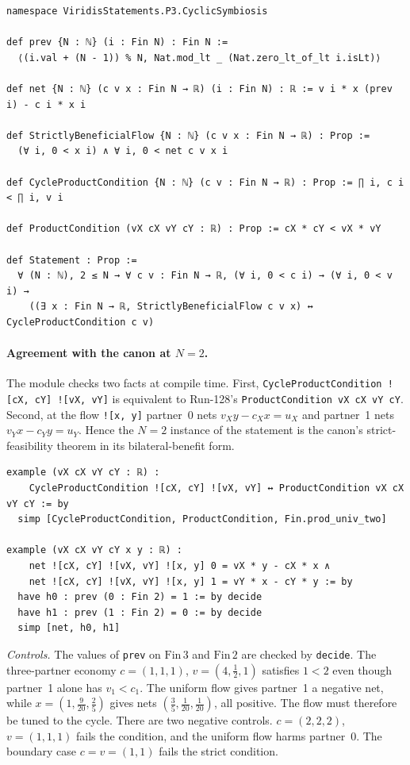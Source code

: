 \documentclass[11pt]{article}
\theoremstyle{remark}
\begin{document}
\begin{lstlisting}[caption={Core of \texttt{proposals/P3.CyclicSymbiosis.lean}. \texttt{ProductCondition} is copied verbatim from the canon file.}]
namespace ViridisStatements.P3.CyclicSymbiosis

def prev {N : ℕ} (i : Fin N) : Fin N :=
  ⟨(i.val + (N - 1)) % N, Nat.mod_lt _ (Nat.zero_lt_of_lt i.isLt)⟩

def net {N : ℕ} (c v x : Fin N → ℝ) (i : Fin N) : ℝ := v i * x (prev i) - c i * x i

def StrictlyBeneficialFlow {N : ℕ} (c v x : Fin N → ℝ) : Prop :=
  (∀ i, 0 < x i) ∧ ∀ i, 0 < net c v x i

def CycleProductCondition {N : ℕ} (c v : Fin N → ℝ) : Prop := ∏ i, c i < ∏ i, v i

def ProductCondition (vX cX vY cY : ℝ) : Prop := cX * cY < vX * vY

def Statement : Prop :=
  ∀ (N : ℕ), 2 ≤ N → ∀ c v : Fin N → ℝ, (∀ i, 0 < c i) → (∀ i, 0 < v i) →
    ((∃ x : Fin N → ℝ, StrictlyBeneficialFlow c v x) ↔ CycleProductCondition c v)
\end{lstlisting}

\paragraph{Agreement with the canon at $N=2$.}
The module checks two facts at compile time. First,
\texttt{CycleProductCondition ![cX, cY] ![vX, vY]} is equivalent to Run-128's
\texttt{ProductCondition vX cX vY cY}. Second, at the flow \texttt{![x, y]} partner~0 nets
$v_Xy-c_Xx=u_X$ and partner~1 nets $v_Yx-c_Yy=u_Y$. Hence the $N=2$ instance of the statement is
the canon's strict-feasibility theorem in its bilateral-benefit form.

\begin{lstlisting}[caption={The $N=2$ agreement checks, as they appear in the module.}]
example (vX cX vY cY : ℝ) :
    CycleProductCondition ![cX, cY] ![vX, vY] ↔ ProductCondition vX cX vY cY := by
  simp [CycleProductCondition, ProductCondition, Fin.prod_univ_two]

example (vX cX vY cY x y : ℝ) :
    net ![cX, cY] ![vX, vY] ![x, y] 0 = vX * y - cX * x ∧
    net ![cX, cY] ![vX, vY] ![x, y] 1 = vY * x - cY * y := by
  have h0 : prev (0 : Fin 2) = 1 := by decide
  have h1 : prev (1 : Fin 2) = 0 := by decide
  simp [net, h0, h1]
\end{lstlisting}

\emph{Controls.} The values of \texttt{prev} on $\mathrm{Fin}\,3$ and $\mathrm{Fin}\,2$ are
checked by \texttt{decide}. The three-partner economy $c=(1,1,1)$, $v=(4,\tfrac12,1)$ satisfies
$1<2$ even though partner~1 alone has $v_1<c_1$. The uniform flow gives partner~1 a negative
net, while $x=(1,\tfrac{9}{20},\tfrac25)$ gives nets $(\tfrac35,\tfrac1{20},\tfrac1{20})$, all
positive. The flow must therefore be tuned to the cycle. There are two negative controls.
$c=(2,2,2)$, $v=(1,1,1)$ fails the condition, and the uniform flow harms partner~0. The
boundary case $c=v=(1,1)$ fails the strict condition.
\end{document}
